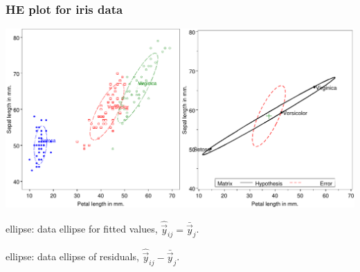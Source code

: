 \begin{frame}
	\frametitle{HE plot for iris data}

  \begin{center}
	\includegraphics[width=.9\textwidth,clip]{fig/heplot31}
	\\ 
  \end{center}
  \begin{itemize*}
  	\item {} ellipse:  data ellipse for fitted values, $\hat{\vec{y}}_{ij} =
	\bar{\vec{y}}_j$.
	\item {} ellipse:  data ellipse of residuals, $\hat{\vec{y}}_{ij} -
	\bar{\vec{y}}_j$.
  \end{itemize*}
\end{frame}


